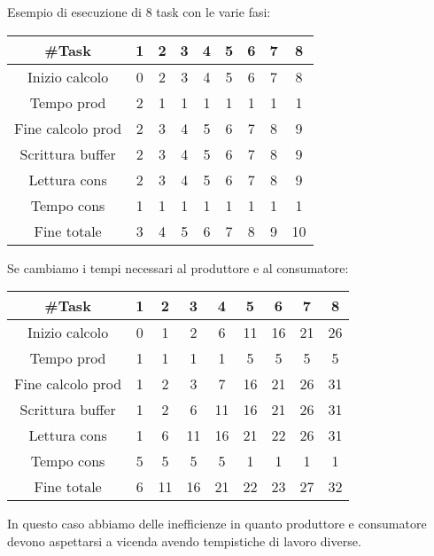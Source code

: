 \begin{example}
	Esempio di esecuzione di 8 task con le varie fasi:
	\begin{table}[!h]
		\centering
		\begin{tabular}{|c|c|c|c|c|c|c|c|c|}
			\hline
			\textbf{\#Task} & \textbf{1} & \textbf{2} & \textbf{3} & \textbf{4} & \textbf{5} & \textbf{6} & \textbf{7} & \textbf{8} \\
			\hline
			Inizio calcolo & 0 & 2 & 3 & 4 & 5 & 6 & 7 & 8\\
			Tempo prod & 2 & 1 & 1 & 1 & 1 & 1 & 1 & 1 \\
			Fine calcolo prod & 2 & 3 & 4 & 5 & 6 & 7  &8  &9 \\
			Scrittura buffer & 2 & 3 & 4 & 5 & 6 & 7  &8  &9 \\
			Lettura cons & 2 & 3 & 4 & 5 & 6 & 7  &8  &9 \\
			Tempo cons& 1 & 1 & 1 & 1 & 1 & 1 & 1 & 1 \\
			Fine totale & 3 & 4 & 5 & 6 & 7  &8  &9 & 10 \\
			\hline
		\end{tabular}
	\end{table}
	Se cambiamo i tempi necessari al produttore e al consumatore:
	\label{example:prodcons}
	\begin{table}[!h]
		\centering
		\begin{tabular}{|c|c|c|c|c|c|c|c|c|}
			\hline
			\textbf{\#Task} & \textbf{1} & \textbf{2} & \textbf{3} & \textbf{4} & \textbf{5} & \textbf{6} & \textbf{7} & \textbf{8} \\
			\hline
			Inizio calcolo & 0 & 1 & 2 & 6 & 11 &16 & 21 & 26\\
			Tempo prod & 1 & 1 & 1 & 1 & 5 & 5 & 5 & 5 \\
			Fine calcolo prod & 1 & 2& 3 & 7 & 16 & 21  &26  &31 \\
			Scrittura buffer & 1 & 2 & 6 & 11 & 16 & 21  &26  &31 \\
			Lettura cons & 1 & 6 & 11 & 16 & 21 & 22  &26  &31 \\
			Tempo cons& 5 & 5 & 5 & 5 & 1 & 1 & 1 & 1 \\
			Fine totale & 6 & 11 & 16 & 21 & 22  &23  &27 & 32 \\
			\hline
		\end{tabular}
	\end{table}
	In questo caso abbiamo delle inefficienze in quanto produttore e consumatore devono aspettarsi a vicenda avendo tempistiche di lavoro diverse.
\end{example}
